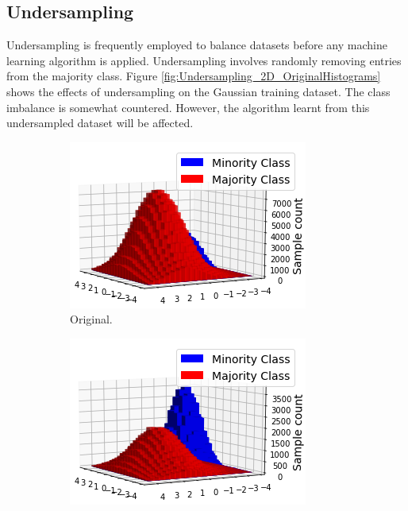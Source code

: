 \documentclass[conference]{IEEEtran}
\begin{document}
	\subsection{Undersampling}
		Undersampling is frequently employed to balance datasets before any machine learning algorithm is applied. Undersampling involves randomly removing entries from the majority class. Figure \ref{fig:Undersampling_2D_OriginalHistograms} shows the effects of undersampling on the Gaussian training dataset. The class imbalance is somewhat countered. However, the algorithm learnt from this undersampled dataset will be affected. %
			\begin{figure}[h]
			     \centering
			     \begin{subfigure}[b]{0.24\textwidth}
			         \centering
			         \includegraphics[width=\textwidth]{Undersampling_2D_OriginalDataset}
			         \caption{Original.}
			         \label{fig:Undersampling_2D_OriginalDataset}
			     \end{subfigure}
			     \hfill
			     \begin{subfigure}[b]{0.24\textwidth}
			         \centering
			         \includegraphics[width=\textwidth]{Undersampling_2D_UndersampledDataset}

\end{subfigure}
\end{figure}
\end{document}
